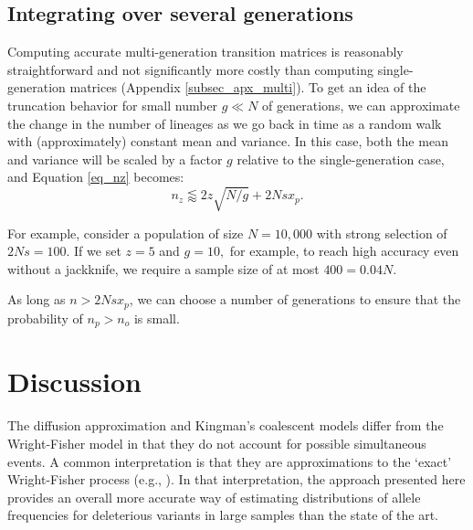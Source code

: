 \documentclass[review,nonatbib]{elsarticle}
\begin{document}
\subsection{Integrating over several generations}

Computing accurate multi-generation transition matrices is reasonably straightforward
and not significantly more costly than computing single-generation matrices
(Appendix \ref{subsec_apx_multi}). To get an idea of the truncation behavior
for small number $g \ll N$ of generations, we can approximate the change  in the number
of lineages as we go back in time as a random walk with (approximately) constant mean and
variance. In this case, both the mean and variance will be scaled by a factor $g$ relative
to the single-generation case, and Equation \eqref{eq_nz} becomes:
\begin{equation}
  n_z \lessapprox 2 z\sqrt{N/g} + 2N s x_p.
\label{eq_nzg}
\end{equation}

For example, consider a population of size $N=10,000$ with strong selection
of $2Ns = 100.$ 
 If we set $z=5$ and $g=10,$ for example, to reach high accuracy even without a jackknife,
  we require a sample size of at most $ 400 = 0.04 N.$

As long as $n>2Ns x_p$, we can choose a number of generations to ensure that the probability of 
$n_p>n_o$ is small.  

\section{Discussion}
\label{sec_conclusion}


The diffusion approximation and Kingman's coalescent models differ from 
the Wright-Fisher model in that they do not account for possible simultaneous events. 
A common interpretation is that they are approximations to the 
`exact' Wright-Fisher process (e.g., \cite{Fu2006}). In that interpretation, the approach presented here 
provides an overall more accurate way of estimating distributions of allele frequencies for deleterious variants 
in large samples than the state of the art. 
\end{document}

